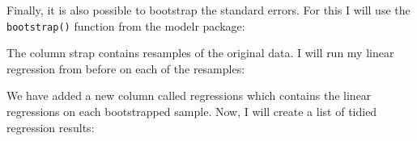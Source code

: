 \documentclass[]{book}
\newenvironment{Shaded}{\begin{snugshade}}{\end{snugshade}}
\newcommand{\DataTypeTok}[1]{\textcolor[rgb]{0.13,0.29,0.53}{#1}}
\newcommand{\DecValTok}[1]{\textcolor[rgb]{0.00,0.00,0.81}{#1}}
\newcommand{\KeywordTok}[1]{\textcolor[rgb]{0.13,0.29,0.53}{\textbf{#1}}}
\newcommand{\NormalTok}[1]{#1}
\newcommand{\OperatorTok}[1]{\textcolor[rgb]{0.81,0.36,0.00}{\textbf{#1}}}
\newcommand{\StringTok}[1]{\textcolor[rgb]{0.31,0.60,0.02}{#1}}
\begin{document}
Finally, it is also possible to bootstrap the standard errors. For this
I will use the \texttt{bootstrap()} function from the modelr package:

\begin{Shaded}
\end{Shaded}

The column strap contains resamples of the original data. I will run my
linear regression from before on each of the resamples:

\begin{Shaded}
\end{Shaded}

We have added a new column called regressions which contains the linear
regressions on each bootstrapped sample. Now, I will create a list of
tidied regression results:

\begin{Shaded}
\end{Shaded}

\begin{Shaded}
\end{Shaded}
\end{document}
